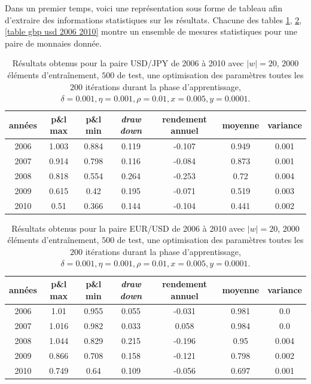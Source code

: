 \documentclass[a4paper, 11pt]{article}
\begin{document}
Dans un premier temps, voici une représentation sous forme de tableau afin d'extraire des informations statistiques sur les résultats. Chacune des tables \ref{table usd jpy 2006 2010}, \ref{table eur usd 2006 2010}, \ref{table gbp usd 2006 2010} montre un ensemble de mesures statistiques pour une paire de monnaies donnée.

\begin{table}[h!]
	\centering
	\begin{tabular}{|c|c|c|c|c|c|c|}
		\hline
			années & p\&l max & p\&l min & \textit{draw down} & rendement annuel & moyenne & variance\\
			\hline
			2006 & 1.003 & 0.884 & 0.119 & -0.107 & 0.949 & 0.001\\
			\hline
			2007 & 0.914 & 0.798 & 0.116 & -0.084 & 0.873 & 0.001\\
			\hline
			2008 & 0.818 & 0.554 & 0.264 & -0.253 & 0.72 & 0.004\\
			\hline
			2009 & 0.615 & 0.42 & 0.195 & -0.071 & 0.519 & 0.003\\
			\hline
			2010 & 0.51 & 0.366 & 0.144 & -0.104 & 0.441 & 0.002\\
			\hline
	\end{tabular}
\caption{Résultats obtenus pour la paire USD/JPY de 2006 à 2010 avec $|w| = 20$, $2000$ éléments d'entraînement, $500$ de test, une optimisation des
	paramètres toutes les $200$ itérations durant la phase d'apprentissage, $\delta = 0.001, \eta=0.001,\rho=0.01, x = 0.005, y=0.0001$.}
\label{table usd jpy 2006 2010}
\end{table}

\begin{table}[h!]
	\centering
	\begin{tabular}{|c|c|c|c|c|c|c|}
		\hline
		années & p\&l max & p\&l min & \textit{draw down} & rendement annuel & moyenne & variance\\
		\hline
		2006 & 1.01 & 0.955 & 0.055 & -0.031 & 0.981 & 0.0\\
		\hline
		2007 & 1.016 & 0.982 & 0.033 & 0.058 & 0.984 & 0.0\\
		\hline
		2008 & 1.044 & 0.829 & 0.215 & -0.196 & 0.95 & 0.004\\
		\hline
		2009 & 0.866 & 0.708 & 0.158 & -0.121 & 0.798 & 0.002\\
		\hline
		2010 & 0.749 & 0.64 & 0.109 & -0.056 & 0.697 & 0.001\\
		\hline
	\end{tabular}
\caption{Résultats obtenus pour la paire EUR/USD de 2006 à 2010 avec $|w| = 20$, $2000$ éléments d'entraînement, $500$ de test, une optimisation des
	paramètres toutes les $200$ itérations durant la phase d'apprentissage, $\delta = 0.001, \eta=0.001,\rho=0.01, x = 0.005, y=0.0001$.}
\label{table eur usd 2006 2010}
\end{table}
\end{document}
